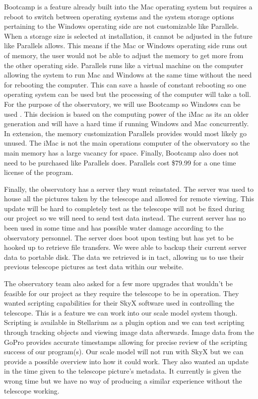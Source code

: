 \documentclass[12pt]{article}
\begin{document}
Bootcamp is a feature already built into the Mac operating system but requires a reboot to switch between operating systems and the system storage options pertaining to the Windows operating side are not customizable like Parallels. When a storage size is selected at installation, it cannot be adjusted in the future like Parallels allows. This means if the Mac or Windows operating side runs out of memory, the user would not be able to adjust the memory to get more from the other operating side. Parallels runs like a virtual machine on the computer allowing the system to run Mac and Windows at the same time without the need for rebooting the computer. This can save a hassle of constant rebooting so one operating system can be used but the processing of the computer will take a toll. For the purpose of the observatory, we will use Bootcamp so Windows can be used \cite{paral}. This decision is based on the computing power of the iMac as its an older generation and will have a hard time if running Windows and Mac concurrently. In extension, the memory customization Parallels provides would most likely go unused. The iMac is not the main operations computer of the observatory so the main memory has a large vacancy for space. Finally, Bootcamp also does not need to be purchased like Parallels does. Parallels cost \$79.99 for a one time license of the program.

Finally, the observatory has a server they want reinstated. The server was used to house all the pictures taken by the telescope and allowed for remote viewing. This update will be hard to completely test as the telescope will not be fixed during our project so we will need to send test data instead. The current server has no been used in some time and has possible water damage according to the observatory personnel. The server does boot upon testing but has yet to be hooked up to retrieve file transfers. We were able to backup their current server data to portable disk. The data we retrieved is in tact, allowing us to use their previous telescope pictures as test data within our website.

The observatory team also asked for a few more upgrades that wouldn’t be feasible for our project as they require the telescope to be in operation. They wanted scripting capabilities for their SkyX software used in controlling the telescope. This is a feature we can work into our scale model system though. Scripting is available in Stellarium as a plugin option and we can test scripting through tracking objects and viewing image data afterwards. Image data from the GoPro provides accurate timestamps allowing for precise review of the scripting success of our program(s). Our scale model will not run with SkyX but we can provide a possible overview into how it could work. They also wanted an update in the time given to the telescope picture’s metadata. It currently is given the wrong time but we have no way of producing a similar experience without the telescope working.
\end{document}
